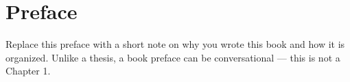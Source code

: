 \chapter*{Preface}

Replace this preface with a short note on why you wrote this book and how
it is organized. Unlike a thesis, a book preface can be conversational —
this is not a Chapter 1.
